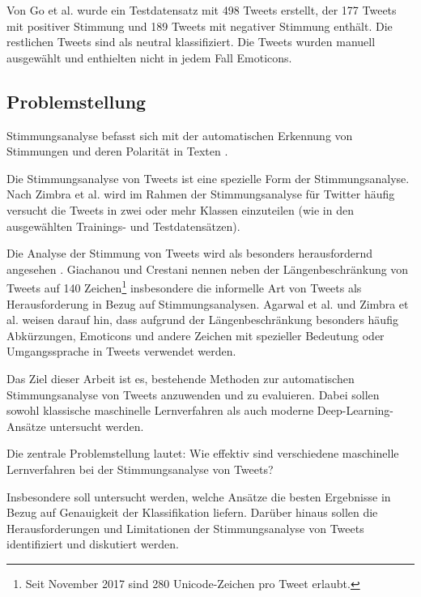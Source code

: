 \documentclass[researchlab,group,]{AIGpaper}
\begin{document}
Von Go et al. \cite{go2009twitter} wurde ein Testdatensatz mit 498 Tweets erstellt, der 177 Tweets mit positiver Stimmung und 189 Tweets mit negativer Stimmung enthält.
Die restlichen Tweets sind als neutral klassifiziert.
Die Tweets wurden manuell ausgewählt und enthielten nicht in jedem Fall Emoticons.

\subsection{Problemstellung}

Stimmungsanalyse befasst sich mit der automatischen Erkennung von Stimmungen und deren Polarität in Texten \cite{giachanou2016like, jianqiang2017comparison, zimbra2018state}.

Die Stimmungsanalyse von Tweets ist eine spezielle Form der Stimmungsanalyse.
Nach Zimbra et al. \cite{zimbra2018state} wird im Rahmen der Stimmungsanalyse für Twitter häufig versucht die Tweets in zwei oder mehr Klassen einzuteilen (wie in den ausgewählten Trainings- und Testdatensätzen).

Die Analyse der Stimmung von Tweets wird als besonders herausfordernd angesehen \cite{agarwal2011sentiment, giachanou2016like, zimbra2018state}.
Giachanou und Crestani \cite{giachanou2016like} nennen neben der Längenbeschränkung von Tweets auf 140 Zeichen\footnote{
    Seit November 2017 sind 280 Unicode-Zeichen pro Tweet erlaubt.
} insbesondere die informelle Art von Tweets als Herausforderung in Bezug auf Stimmungsanalysen.
Agarwal et al. \cite{agarwal2011sentiment} und Zimbra et al. \cite{zimbra2018state} weisen darauf hin, dass aufgrund der Längenbeschränkung besonders häufig Abkürzungen, Emoticons und andere Zeichen mit spezieller Bedeutung oder Umgangssprache in Tweets verwendet werden.
\newline


Das Ziel dieser Arbeit ist es, bestehende Methoden zur automatischen Stimmungsanalyse von Tweets anzuwenden und zu evaluieren.
Dabei sollen sowohl klassische maschinelle Lernverfahren als auch moderne Deep-Learning-Ansätze untersucht werden.

Die zentrale Problemstellung lautet: Wie effektiv sind verschiedene maschinelle Lernverfahren bei der Stimmungsanalyse von Tweets?

Insbesondere soll untersucht werden, welche Ansätze die besten Ergebnisse in Bezug auf Genauigkeit der Klassifikation liefern.
Darüber hinaus sollen die Herausforderungen und Limitationen der Stimmungsanalyse von Tweets identifiziert und diskutiert werden.
\end{document}
